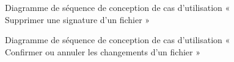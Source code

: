 \begin{figure}[H]
  \centering
  \caption{Diagramme de séquence de conception de cas d'utilisation « Supprimer une signature d'un fichier »}
  \label{fig:sequence_conception_delete_signature_from_foile}
\end{figure}

\begin{figure}[H]
  \centering
  \caption{Diagramme de séquence de conception de cas d'utilisation « Confirmer ou annuler les changements d'un fichier »}
  \label{fig:sequence_conception_save_cancel_siganture}
\end{figure}




